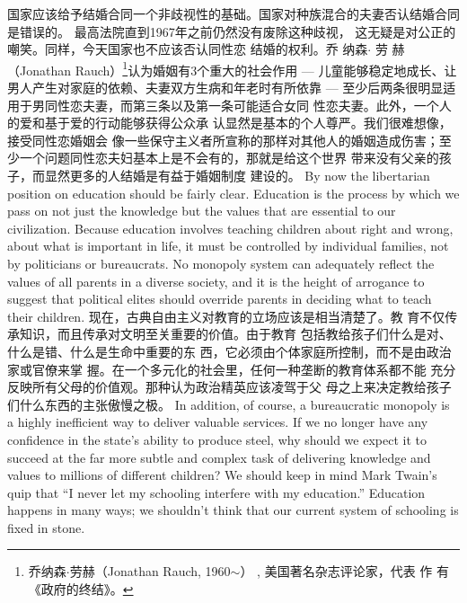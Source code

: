 \begin{paracol}{2}
\switchcolumn
国家应该给予结婚合同一个非歧视性的基础。国家对种族混合的夫妻否认结婚合同是错误的。
最高法院直到1967年之前仍然没有废除这种歧视，
这无疑是对公正的嘲笑。同样，今天国家也不应该否认同性恋
结婚的权利。乔 纳森$\cdot$ 劳 赫（Jonathan  Rauch）\footnote{乔纳森$\cdot$劳赫（Jonathan Rauch, 1960$\sim$） , 美国著名杂志评论家，代表 作 有 《政府的终结》。}认为婚姻有3个重大的社会作用 --- 儿童能够稳定地成长、让男人产生对家庭的依赖、夫妻双方生病和年老时有所依靠 --- 至少后两条很明显适用于男同性恋夫妻，而第三条以及第一条可能适合女同
性恋夫妻。此外，一个人的爱和基于爱的行动能够获得公众承
认显然是基本的个人尊严。我们很难想像，接受同性恋婚姻会
像一些保守主义者所宣称的那样对其他人的婚姻造成伤害；至
少一个问题同性恋夫妇基本上是不会有的，那就是给这个世界
带来没有父亲的孩子，而显然更多的人结婚是有益于婚姻制度
建设的。
\newpage
{}
By now the libertarian position on education should be fairly
clear. Education is the process by which we pass on not just the
knowledge but the values that are essential to our civilization.
Because education involves teaching children about right and
wrong, about what is important in life, it must be controlled by
individual families, not by politicians or bureaucrats. No monopoly system can adequately reflect the values of all parents in
a diverse society, and it is the height of arrogance to suggest that political elites should override parents in deciding what to
teach their children.
\switchcolumn
现在，古典自由主义对教育的立场应该是相当清楚了。教
育不仅传承知识，而且传承对文明至关重要的价值。由于教育
包括教给孩子们什么是对、什么是错、什么是生命中重要的东
西，它必须由个体家庭所控制，而不是由政治家或官僚来掌
握。在一个多元化的社会里，任何一种垄断的教育体系都不能
充分反映所有父母的价值观。那种认为政治精英应该凌驾于父
母之上来决定教给孩子们什么东西的主张傲慢之极。
\switchcolumn*
In addition, of course, a bureaucratic monopoly is a highly
inefficient way to deliver valuable services. If we no longer have
any confidence in the state's ability to produce steel, why
should we expect it to succeed at the far more subtle and complex task of delivering knowledge and values to millions of different children? We should keep in mind Mark Twain's quip
that ``I never let my schooling interfere with my education.''
Education happens in many ways; we shouldn't think that our
current system of schooling is fixed in stone.

\end{paracol}
